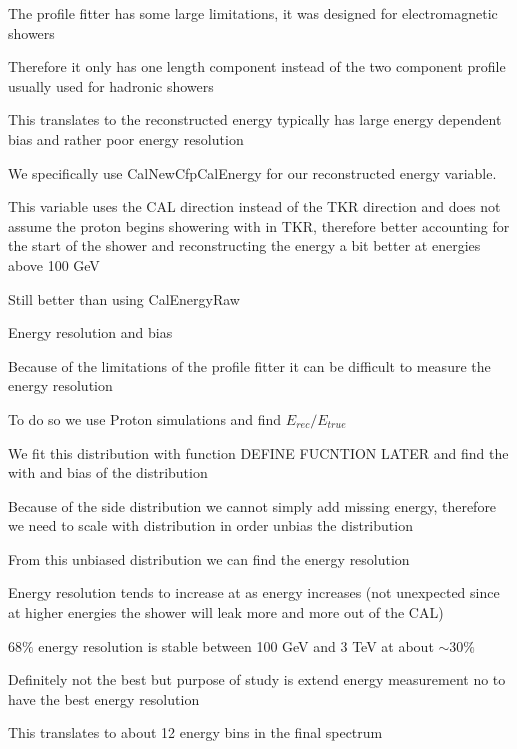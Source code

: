 \documentclass{article}
\begin{document}
\begin{myEnumerate}
\begin{myEnumerate}
\begin{myEnumerate}
					\item The profile fitter has some large limitations, it was designed for electromagnetic showers
					\item Therefore it only has one length component instead of the two component profile usually used for hadronic showers
					\item This translates to the reconstructed energy typically has large energy dependent bias and rather poor energy resolution
					\item We specifically use CalNewCfpCalEnergy for our reconstructed energy variable.
					\item This variable uses the CAL direction instead of the TKR direction and does not assume the proton begins showering with in TKR, therefore better accounting for the start of the shower and reconstructing the energy a bit better at energies above 100 GeV
					\item Still better than using CalEnergyRaw
				\end{myEnumerate}
				\item Energy resolution and bias
				\begin{myEnumerate}
					\item Because of the limitations of the profile fitter it can be difficult to measure the energy resolution
					\item To do so we use Proton simulations and find $E_{rec}/E_{true}$
					\item We fit this distribution with function DEFINE FUCNTION LATER and find the with and bias of the distribution
					\item Because of the side distribution we cannot simply add missing energy, therefore we need to scale with distribution in order unbias the distribution
					\item From this unbiased distribution we can find the energy resolution
					\item Energy resolution tends to increase at as energy increases (not unexpected since at higher energies the shower will leak more and more out of the CAL)
					\item $68\%$ energy resolution is stable between 100 GeV and 3 TeV at about $\sim 30\%$
					\item Definitely not the best but purpose of study is extend energy measurement no to have the best energy resolution
					\item This translates to about 12 energy bins in the final spectrum
				\end{myEnumerate}

\end{myEnumerate}
\end{myEnumerate}
\end{document}

